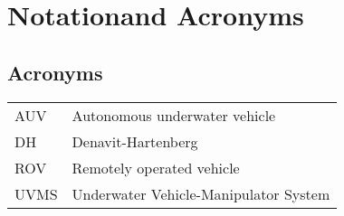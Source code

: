 \section*{Notationand Acronyms}

\subsection*{Acronyms}
    \begin{longtable}{p{6cm}p{10cm}}
		AUV & Autonomous underwater vehicle
		\\
		DH & Denavit-Hartenberg 
		\\
		ROV & Remotely operated vehicle 
		\\
		UVMS & Underwater Vehicle-Manipulator System


    \end{longtable}
